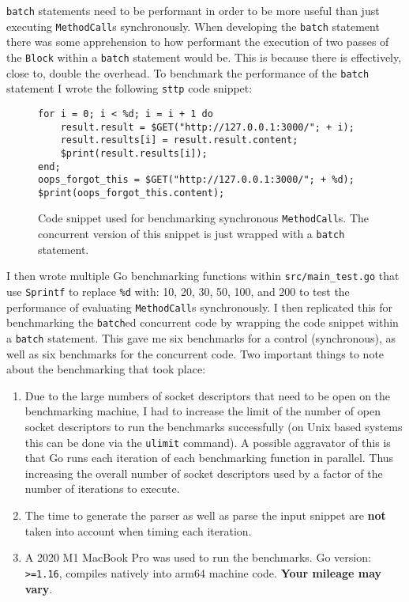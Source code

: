 \verb|batch| statements need to be performant in order to be more useful than just executing \verb|MethodCall|s synchronously. When developing the \verb|batch| statement there was some apprehension to how performant the execution of two passes of the \verb|Block| within a \verb|batch| statement would be. This is because there is effectively, close to, double the overhead. To benchmark the performance of the \verb|batch| statement I wrote the following \verb|sttp| code snippet:

\begin{figure}[H]
    \begin{verbatim}
for i = 0; i < %d; i = i + 1 do
    result.result = $GET("http://127.0.0.1:3000/"; + i);
    result.results[i] = result.result.content;
    $print(result.results[i]);
end;
oops_forgot_this = $GET("http://127.0.0.1:3000/"; + %d);
$print(oops_forgot_this.content);
    \end{verbatim}
    \cprotect\caption{Code snippet used for benchmarking synchronous \verb|MethodCall|s. The concurrent version of this snippet is just wrapped with a \verb|batch| statement.}
    \label{sec:eval-ast-nodes-batch-bench-snippet}
\end{figure}

I then wrote multiple Go benchmarking functions within \verb|src/main_test.go| that use \verb|Sprintf| to replace \verb|%d| with: 10, 20, 30, 50, 100, and 200 to test the performance of evaluating \verb|MethodCall|s synchronously. I then replicated this for benchmarking the \verb|batch|ed concurrent code by wrapping the code snippet within a \verb|batch| statement. This gave me six benchmarks for a control (synchronous), as well as six benchmarks for the concurrent code. Two important things to note about the benchmarking that took place:

\begin{enumerate}
    \item Due to the large numbers of socket descriptors that need to be open on the benchmarking machine, I had to increase the limit of the number of open socket descriptors to run the benchmarks successfully (on Unix based systems this can be done via the \verb|ulimit| command). A possible aggravator of this is that Go runs each iteration of each benchmarking function in parallel. Thus increasing the overall number of socket descriptors used by a factor of the number of iterations to execute.
    \item The time to generate the parser as well as parse the input snippet are \textbf{not} taken into account when timing each iteration.
    \item A 2020 M1 MacBook Pro was used to run the benchmarks. Go version: \verb|>=1.16|, compiles natively into arm64 machine code\textsuperscript{\cite{go_1_16}}. \textbf{Your mileage may vary}.
\end{enumerate}

